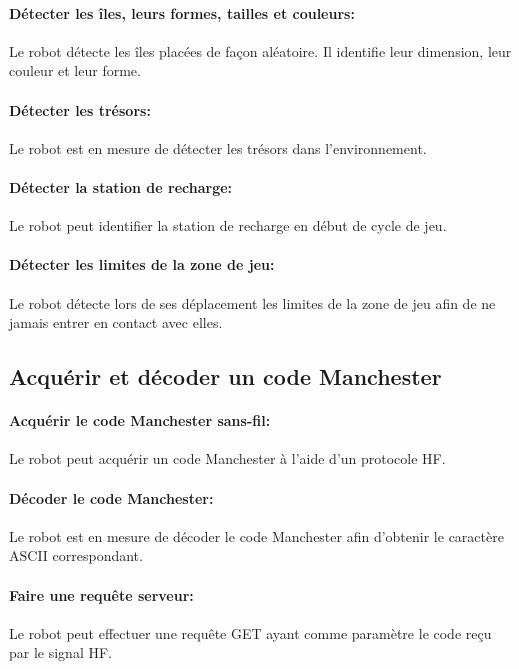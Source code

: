 \paragraph{Détecter les îles, leurs formes, tailles et couleurs:}
Le robot détecte les îles placées de façon aléatoire. Il identifie leur dimension, leur couleur et leur forme.

\paragraph{Détecter les trésors:}
Le robot est en mesure de détecter les trésors dans l'environnement.

\paragraph{Détecter la station de recharge:}
Le robot peut identifier la station de recharge en début de cycle de jeu.

\paragraph{Détecter les limites de la zone de jeu:}
Le robot détecte lors de ses déplacement les limites de la zone de jeu afin de ne jamais entrer en contact avec elles.

\subsection{Acquérir et décoder un code Manchester}

\paragraph{Acquérir le code Manchester sans-fil:}
Le robot peut acquérir un code Manchester à l'aide d'un protocole HF.

\paragraph{Décoder le code Manchester:}
Le robot est en mesure de décoder le code Manchester afin d'obtenir le caractère ASCII correspondant.

\paragraph{Faire une requête serveur:}
Le robot peut effectuer une requête GET ayant comme paramètre le code reçu par le signal HF.

